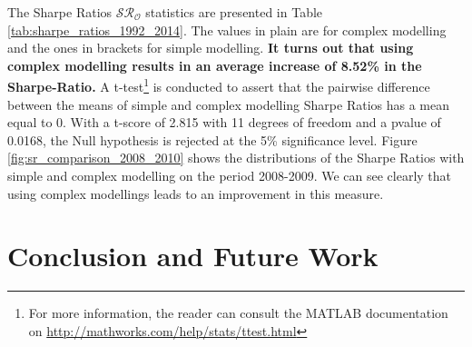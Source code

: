 \documentclass[11pt,a4,twosided,singlespacing,titlepagenumber=on]{scrreprt}
\numberwithin{equation}{chapter} %
\theoremstyle{remark}
\begin{document}
The Sharpe Ratios $\mathcal{SR}_\mathcal{O}$ statistics are presented in Table \ref{tab:sharpe_ratios_1992_2014}. The values in plain are for complex modelling and the ones in brackets for simple modelling. \textbf{It turns out that using complex modelling results in an average increase of 8.52\% in the Sharpe-Ratio.} A t-test\footnote{For more information, the reader can consult the MATLAB documentation on \url{http://mathworks.com/help/stats/ttest.html}} is conducted to assert that the pairwise difference between the means of simple and complex modelling Sharpe Ratios has a mean equal to 0. With a t-score of 2.815 with 11 degrees of freedom and a pvalue of 0.0168, the Null hypothesis is rejected at the 5\% significance level. Figure \ref{fig:sr_comparison_2008_2010} shows the distributions of the Sharpe Ratios with simple and complex modelling on the period 2008-2009. We can see clearly that using complex modellings leads to an improvement in this measure.


\chapter{Conclusion and Future Work}
\end{document}
